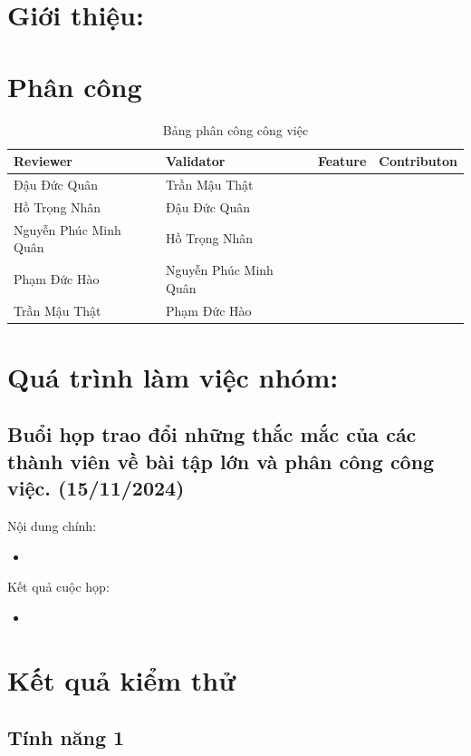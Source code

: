 \documentclass[a4paper, 12pt]{article}
\begin{document}
\newpage
\tableofcontents
\newpage
\section{Giới thiệu:}

\section{Phân công}
 \begin{table}[H]
\centering
\begin{tabular}{|p{3cm}|p{3cm}|l|c|}
\hline 
Reviewer &
Validator &
  \multicolumn{1}{c|}{Feature} &Contributon \\ \hline
Đậu Đức Quân & Trần Mậu Thật &&\\\hline
Hồ Trọng Nhân & Đậu Đức Quân &&\\ \hline
Nguyễn Phúc Minh Quân & Hồ Trọng Nhân &&\\ \hline
Phạm Đức Hào & Nguyễn Phúc Minh Quân &&\\ \hline
Trần Mậu Thật & Phạm Đức Hào &&\\ \hline
\end{tabular}
\caption{Bảng phân công công việc}
\label{tab:my-table}
\end{table}





\newpage
\section{Quá trình làm việc nhóm:}
\subsection{Buổi họp trao đổi những thắc mắc của các thành viên về bài tập lớn và phân công công việc. (15/11/2024)}
Nội dung chính:
\begin{itemize}
    \item
\end{itemize}
Kết quả cuộc họp:
\begin{itemize}
  \item
\end{itemize}

\newpage

\section{Kết quả kiểm thử}

\subsection{Tính năng 1}
\end{document}

